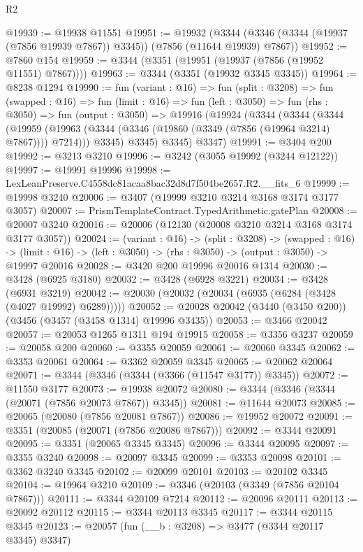 \begin{lexlean}{R2}
\begin{coremodule}
@19939 := @19938 @11551
@19951 := @19932
    (@3344 (@3346 (@3344 (@19937 (@7856 @19939 @7867)) @3345)) (@7856 (@11644 @19939) @7867))
@19952 := @7860 @154
@19959 := @3344 (@3351 (@19951 (@19937 (@7856 (@19952 @11551) @7867))))
@19963 := @3344 (@3351 (@19932 @3345 @3345))
@19964 := @8238 @1294
@19990 := fun (variant : @16) =>
  fun (split : @3208) =>
  fun (swapped : @16) =>
  fun (limit : @16) =>
  fun (left : @3050) =>
  fun (rhs : @3050) =>
  fun (output : @3050) =>
  @19916
    (@19924
      (@3344
        (@3344
          (@3344
            (@19959 (@19963 (@3344 (@3346 (@19860 (@3349 (@7856 (@19964 @3214) @7867)))) @7214)))
            @3345)
          @3345)
        @3345)
      @3347)
@19991 := @3404 @200
@19992 := @3213 @3210
@19996 := @3242 (@3055 @19992 (@3244 @12122))
@19997 := @19991 @19996
@19998 := LexLeanPreserve.C4558dc81acaa8bac32d8d7f504be2657.R2.__fits_6
@19999 := @19998 @3240
@20006 := @3407 (@19999 @3210 @3214 @3168 @3174 @3177 @3057)
@20007 := PrismTemplateContract.TypedArithmetic.gatePlan
@20008 := @20007 @3240
@20016 := @20006 (@12130 (@20008 @3210 @3214 @3168 @3174 @3177 @3057))
@20024 := (variant : @16) ->
  (split : @3208) ->
  (swapped : @16) ->
  (limit : @16) -> (left : @3050) -> (rhs : @3050) -> (output : @3050) -> @19997 @20016
@20028 := @3420 @200 @19996 @20016 @1314
@20030 := @3428 (@6925 @3180)
@20032 := @3428 (@6928 @3221)
@20034 := @3428 (@6931 @3219)
@20042 := @20030 (@20032 (@20034 (@6935 (@6284 (@3428 (@4027 @19992) @6289)))))
@20052 := @20028 @20042 (@3440 (@3450 @200)) (@3456 (@3457 (@3458 @1314) @19996 @3435))
@20053 := @3466 @20042
@20057 := @20053 @1265 @1311 @194 @19915
@20058 := @3356 @3237
@20059 := @20058 @200
@20060 := @3355 @20059
@20061 := @20060 @3345
@20062 := @3353 @20061
@20064 := @3362 @20059 @3345
@20065 := @20062 @20064
@20071 := @3344 (@3346 (@3344 (@3366 (@11547 @3177)) @3345))
@20072 := @11550 @3177
@20073 := @19938 @20072
@20080 := @3344 (@3346 (@3344 (@20071 (@7856 @20073 @7867)) @3345))
@20081 := @11644 @20073
@20085 := @20065 (@20080 (@7856 @20081 @7867))
@20086 := @19952 @20072
@20091 := @3351 (@20085 (@20071 (@7856 @20086 @7867)))
@20092 := @3344 @20091
@20095 := @3351 (@20065 @3345 @3345)
@20096 := @3344 @20095
@20097 := @3355 @3240
@20098 := @20097 @3345
@20099 := @3353 @20098
@20101 := @3362 @3240 @3345
@20102 := @20099 @20101
@20103 := @20102 @3345
@20104 := @19964 @3210
@20109 := @3346 (@20103 (@3349 (@7856 @20104 @7867)))
@20111 := @3344 @20109 @7214
@20112 := @20096 @20111
@20113 := @20092 @20112
@20115 := @3344 @20113 @3345
@20117 := @3344 @20115 @3345
@20123 := @20057 (fun (__b : @3208) => @3477 (@3344 @20117 @3345) @3347)

\end{coremodule}
\end{lexlean}
